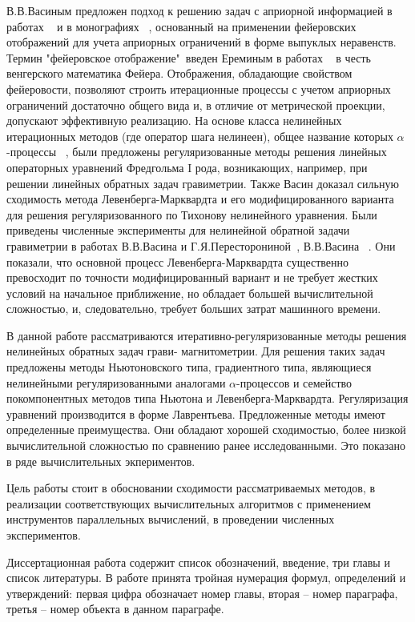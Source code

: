 \documentclass[14pt]{article}
\begin{document}
В.В.Васиным предложен подход к решению задач с априорной информацией в работах ~\cite{Vas1982, Vas1988} и в монографиях ~\cite{VasAge1993, VasEre2005}, основанный на применении фейеровских отображений для учета априорных ограничений в форме выпуклых неравенств. Термин "фейеровское отображение"\ введен Ереминым в работах ~\cite{Ere1965, Ere1966, Ere1968} в честь венгерского математика Фейера. Отображения, обладающие свойством фейеровости, позволяют строить итерационные процессы с учетом априорных ограничений достаточно общего вида и, в отличие от метрической проекции, допускают эффективную реализацию. На основе класса нелинейных итерационных методов (где оператор шага нелинеен), общее название которых $\alpha$-процессы  ~\cite{KraVaiZab1969}, были предложены регуляризованные методы решения линейных операторных уравнений Фредгольма I рода, возникающих, например, при решении линейных обратных задач гравиметрии. Также Васин доказал сильную сходимость метода Левенберга-Марквардта и его модифицированного варианта для решения регуляризованного по Тихонову нелинейного уравнения. Были приведены численные эксперименты для нелинейной обратной задачи гравиметрии в работах В.В.Васина и Г.Я.Пересторониной~\cite{VasPer2011}, В.В.Васина ~\cite{Vas2012}. Они показали, что основной процесс Левенберга-Марквардта существенно превосходит по точности модифицированный вариант и не требует жестких условий на начальное приближение, но обладает большей вычислительной сложностью, и, следовательно, требует больших затрат машинного времени. 

В данной работе рассматриваются итеративно-регуляризованные методы решения нелинейных обратных задач грави- магнитометрии. Для решения таких задач предложены методы Ньютоновского типа, градиентного типа, являющиеся нелинейными регуляризованными аналогами $\alpha$-процессов и семейство покомпонентных методов типа Ньютона и Левенберга-Марквардта. Регуляризация уравнений производится в форме Лаврентьева. Предложенные методы имеют определенные преимущества. Они обладают хорошей сходимостью, более низкой вычислительной сложностью по сравнению ранее исследованными. Это показано в ряде вычислительных экпериментов.

Цель работы стоит в обосновании сходимости рассматриваемых методов, в реализации соответствующих вычислительных алгоритмов с применением инструментов параллельных вычислений, в проведении численных экспериментов.

Диссертационная работа содержит список обозначений, введение, три главы и список литературы. В работе принята тройная нумерация формул, определений и утверждений: первая цифра обозначает номер главы, вторая -- номер параграфа, третья -- номер объекта в данном параграфе.
\end{document}
